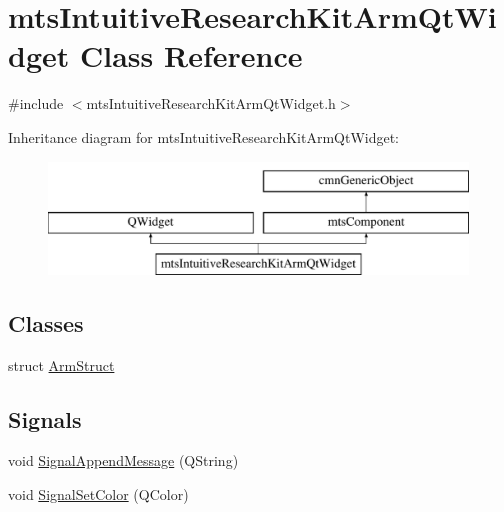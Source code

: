 \hypertarget{classmts_intuitive_research_kit_arm_qt_widget}{}\section{mts\+Intuitive\+Research\+Kit\+Arm\+Qt\+Widget Class Reference}
\label{classmts_intuitive_research_kit_arm_qt_widget}


{\ttfamily \#include $<$mts\+Intuitive\+Research\+Kit\+Arm\+Qt\+Widget.\+h$>$}

Inheritance diagram for mts\+Intuitive\+Research\+Kit\+Arm\+Qt\+Widget\+:\begin{figure}[H]
\begin{center}
\leavevmode
\includegraphics[height=3.000000cm]{d9/d99/classmts_intuitive_research_kit_arm_qt_widget}
\end{center}
\end{figure}
\subsection*{Classes}
\begin{DoxyCompactItemize}
\item 
struct \hyperlink{structmts_intuitive_research_kit_arm_qt_widget_1_1_arm_struct}{Arm\+Struct}
\end{DoxyCompactItemize}
\subsection*{Signals}
\begin{DoxyCompactItemize}
\item 
void \hyperlink{classmts_intuitive_research_kit_arm_qt_widget_adb74dc2f4dec9467017eeef010969579}{Signal\+Append\+Message} (Q\+String)
\item 
void \hyperlink{classmts_intuitive_research_kit_arm_qt_widget_ac8d02042dcbb4d76626ba7ab1cbc6e23}{Signal\+Set\+Color} (Q\+Color)
\end{DoxyCompactItemize}
